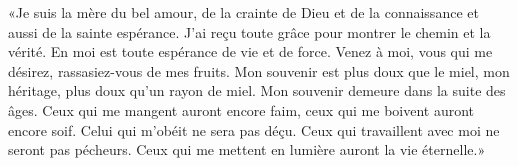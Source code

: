 «Je suis la mère du bel amour, de la crainte de Dieu et de la connaissance
	et aussi de la sainte espérance.
J’ai reçu toute grâce pour montrer le chemin et la vérité.
	En moi est toute espérance de vie et de force.
	Venez à moi, vous qui me désirez, rassasiez-vous de mes fruits.
Mon souvenir est plus doux que le miel,
	mon héritage, plus doux qu’un rayon de miel.
	Mon souvenir demeure dans la suite des âges.
Ceux qui me mangent auront encore faim,
	ceux qui me boivent auront encore soif.
Celui qui m’obéit ne sera pas déçu.
	Ceux qui travaillent avec moi ne seront pas pécheurs.
	Ceux qui me mettent en lumière auront la vie éternelle.»

